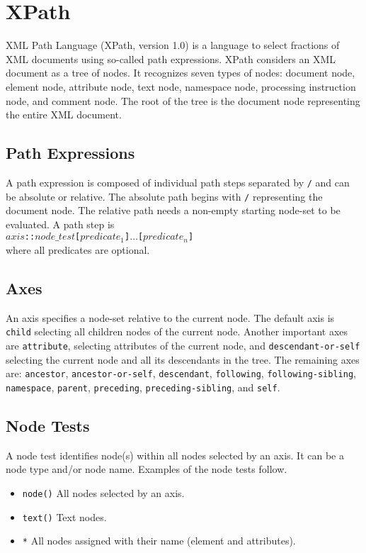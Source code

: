
\section{XPath}
XML Path Language (XPath, version 1.0) \cite{xpath} is a language to select fractions of XML documents using so-called path expressions. XPath considers an XML document as a tree of nodes. It recognizes seven types of nodes: document node, element node, attribute node, text node, namespace node, processing instruction node, and comment node. The root of the tree is the document node representing the entire XML document.

\subsection{Path Expressions}
A path expression is composed of individual path steps separated by \texttt{/} and can be absolute or relative. The absolute path begins with \texttt{/} representing the document node. The relative path needs a non-empty starting node-set to be evaluated. A path step is \\ \texttt{$axis$::$node\_test$[$predicate_1$]$\dots$[$predicate_n$]} \\
where all predicates are optional.

\subsection{Axes}
An axis specifies a node-set relative to the current node. The default axis is \texttt{child} selecting all children nodes of the current node. Another important axes are \texttt{attribute}, selecting attributes of the current node, and \texttt{descendant-or-self} selecting the current node and all its descendants in the tree. The remaining axes are: \texttt{ancestor}, \texttt{ancestor-or-self}, \texttt{descendant}, \texttt{following}, \texttt{following-sibling}, \texttt{namespace}, \texttt{parent}, \texttt{preceding}, \texttt{preceding-sibling}, and \texttt{self}.

\subsection{Node Tests}
A node test identifies node(s) within all nodes selected by an axis. It can be a node type and/or node name. Examples of the node tests follow.
\begin{itemize}
\item \texttt{node()} All nodes selected by an axis.
\item \texttt{text()} Text nodes.
\item \texttt{*} All nodes assigned with their name (element and attributes).
\end{itemize}

